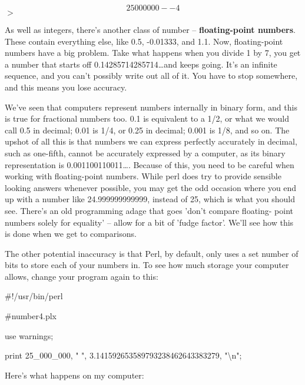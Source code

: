 \documentclass[a4paper,11pt]{book}
\begin{document}
\[25000000 --4\] 
$>$

\noindent 

\noindent As well as integers, there's another class of number -- \textbf{floating-point numbers}. These contain everything else, like 0.5, -0.01333, and 1.1. Now, floating-point numbers have a big problem. Take what happens when you divide 1 by 7, you get a number that starts off 0.14285714285714\dots  and keeps going. It's an infinite sequence, and you can't possibly write out all of it. You have to stop somewhere, and this means you lose accuracy.

\noindent 

\noindent We've  seen that computers  represent  numbers  internally  in  binary  form,  and  this  is  true for  fractional numbers too.  0.1  is equivalent  to  a  1/2,  or what  we would  call  0.5 in  decimal;  0.01  is  1/4,  or  0.25 in decimal;  0.001  is  1/8,  and so  on.  The  upshot  of all  this  is  that  numbers  we  can express  perfectly accurately  in decimal,  such as  one-fifth,  cannot  be  accurately  expressed  by  a  computer, as its binary representation is 0.001100110011\dots .  Because  of  this,  you  need  to  be  careful  when  working  with floating-point numbers.  While  perl  does  try  to  provide  sensible looking  answers  whenever  possible, you  may get the odd occasion  where  you  end  up  with  a  number  like  24.999999999999,  instead  of  25, which is what you  should see.  There's  an old  programming  adage  that  goes  'don't  compare  floating- point numbers solely for equality'  --  allow  for  a  bit  of 'fudge  factor'.  We'll  see how  this  is  done when we get to comparisons.

\noindent 

\noindent The other potential inaccuracy is that Perl, by default, only uses a set number of bits to store each of your numbers in. To see how much storage your computer allows, change your program again to this:

\noindent 

\noindent 

\noindent \#!/usr/bin/perl

\noindent \#number4.plx

\noindent use warnings;

\noindent print 25\_000\_000, " ", 3.141592653589793238462643383279, "\textbackslash n";

\noindent 

\noindent Here's what happens on my computer:
\end{document}
